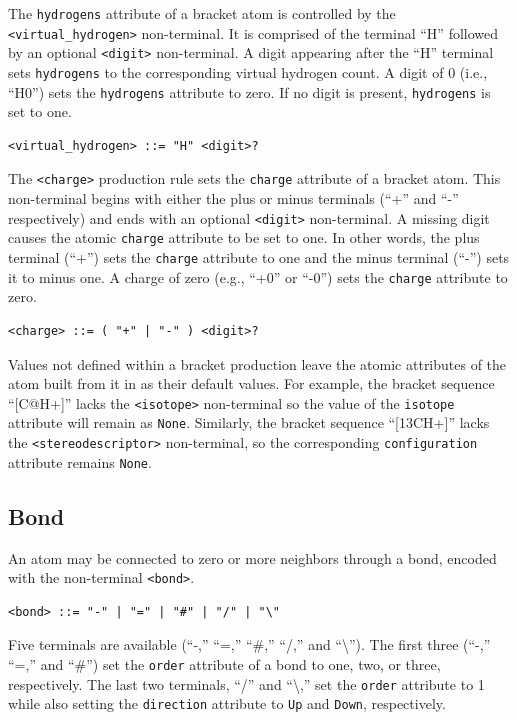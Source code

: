 \documentclass{article}
\def\ttt{\texttt}
\begin{document}
The \ttt{hydrogens} attribute of a bracket atom is controlled by the \\ \ttt{<virtual{\_}hydrogen>} non-terminal. It is comprised of the terminal \enquote{H} followed by an optional \ttt{<digit>} non-terminal. A digit appearing after the \enquote{H} terminal sets \ttt{hydrogens} to the corresponding virtual hydrogen count. A digit of 0 (i.e., \enquote{H0}) sets the \ttt{hydrogens} attribute to zero. If no digit is present, \ttt{hydrogens} is set to one.

\begin{lstlisting}
<virtual_hydrogen> ::= "H" <digit>?
\end{lstlisting}

The \ttt{<charge>} production rule sets the \ttt{charge} attribute of a bracket atom. This non-terminal begins with either the plus or minus terminals (\enquote{+} and \enquote{-} respectively) and ends with an optional \ttt{<digit>} non-terminal. A missing digit causes the atomic \ttt{charge} attribute to be set to one. In other words, the plus terminal (\enquote{+}) sets the \ttt{charge} attribute to one and the minus terminal (\enquote{-}) sets it to minus one. A charge of zero (e.g., \enquote{+0} or \enquote{-0}) sets the \ttt{charge} attribute to zero.

\begin{lstlisting}
<charge> ::= ( "+" | "-" ) <digit>?
\end{lstlisting}

Values not defined within a bracket production leave the atomic attributes of the atom built from it in as their default values. For example, the bracket sequence \enquote{[C@H+]} lacks the \ttt{<isotope>} non-terminal so the value of the \ttt{isotope} attribute will remain as \ttt{None}. Similarly, the bracket sequence \enquote{[13CH+]} lacks the \ttt{<stereodescriptor>} non-terminal, so the corresponding \ttt{configuration} attribute remains \ttt{None}.

\subsection*{Bond}

An atom may be connected to zero or more neighbors through a bond, encoded with the non-terminal \ttt{<bond>}.

\begin{lstlisting}
<bond> ::= "-" | "=" | "#" | "/" | "\"
\end{lstlisting}

Five terminals are available (\enquote{-,} \enquote{=,} \enquote{\#,} \enquote{/,} and \enquote{\textbackslash}). The first three (\enquote{-,} \enquote{=,} and \enquote{\#}) set the \ttt{order} attribute of a bond to one, two, or three, respectively. The last two terminals, \enquote{/} and \enquote{\textbackslash,} set the \ttt{order} attribute to 1 while also setting the \ttt{direction} attribute to \ttt{Up} and \ttt{Down}, respectively.
\end{document}
